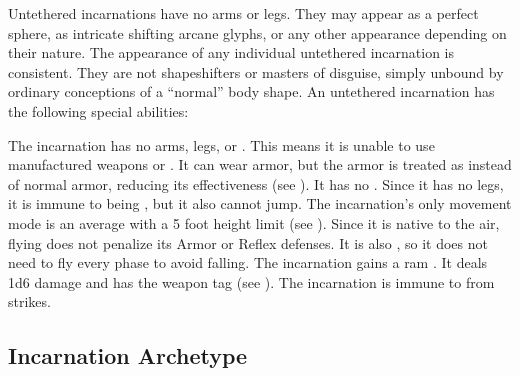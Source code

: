   Untethered incarnations have no arms or legs.
  They may appear as a perfect sphere, as intricate shifting arcane glyphs, or any other appearance depending on their nature.
  The appearance of any individual untethered incarnation is consistent.
  They are not shapeshifters or masters of disguise, simply unbound by ordinary conceptions of a ``normal'' body shape.
  An untethered incarnation has the following special abilities:
  \begin{raggeditemize}
     The incarnation has no arms, legs, or .
      This means it is unable to use manufactured weapons or .
      It can wear armor, but the armor is treated as  instead of normal armor, reducing its effectiveness (see ).
      It has no .
      Since it has no legs, it is immune to being \prone, but it also cannot jump.
     The incarnation's only movement mode is an average  with a 5 foot height limit (see ).
      Since it is native to the air, flying does not penalize its Armor or Reflex defenses.
      It is also , so it does not need to fly every phase to avoid falling.
     The incarnation gains a ram .
      It deals 1d6 damage and has the  weapon tag (see ).
     The incarnation is immune to  from strikes.
  \end{raggeditemize}

  \subsection{Incarnation Archetype}

